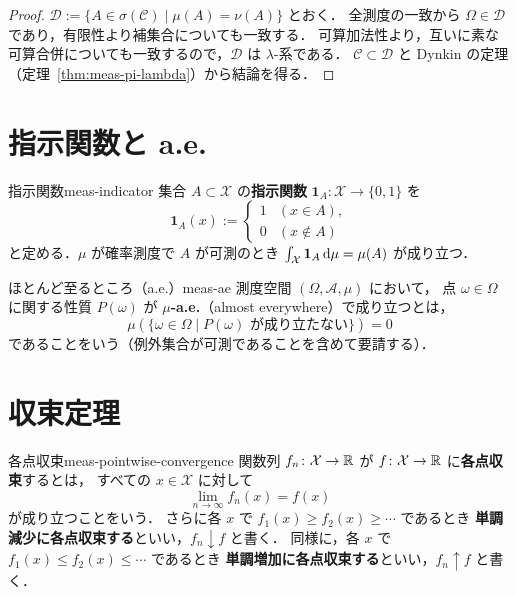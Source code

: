\begin{proof}
  $\mathcal{D}:=\{A\in\sigma(\mathcal{C})\mid\mu(A)=\nu(A)\}$ とおく．
  全測度の一致から $\Omega\in\mathcal{D}$ であり，有限性より補集合についても一致する．
  可算加法性より，互いに素な可算合併についても一致するので，$\mathcal{D}$ は $\lambda$-系である．
  $\mathcal{C}\subset\mathcal{D}$ と Dynkin の定理（定理~\ref{thm:meas-pi-lambda}）から結論を得る．
\end{proof}

\section{指示関数と a.e.}

\begin{definition}{指示関数}{meas-indicator}
  集合 $A\subset \mathcal{X}$ の\textbf{指示関数} $\mathbf{1}_A\colon \mathcal{X}\to\{0,1\}$ を
  \[
    \mathbf{1}_A(x):=
    \begin{cases}
      1 & (x\in A),\\
      0 & (x\notin A)
    \end{cases}
  \]
  と定める．$\mu$ が確率測度で $A$ が可測のとき
  $\int_{\mathcal{X}}\mathbf{1}_A\,\mathrm{d}\mu=\mu(A)$ が成り立つ．
\end{definition}

\begin{definition}{ほとんど至るところ（a.e.）}{meas-ae}
  測度空間 $(\Omega,\mathcal{A},\mu)$ において，
  点 $\omega\in\Omega$ に関する性質 $P(\omega)$ が
  $\mu$\textbf{-a.e.}（almost everywhere）で成り立つとは，
  \[
    \mu(\{\omega\in\Omega\mid P(\omega)\text{ が成り立たない}\})=0
  \]
  であることをいう（例外集合が可測であることを含めて要請する）．
\end{definition}

\section{収束定理}

\begin{definition}{各点収束}{meas-pointwise-convergence}
  関数列 $f_n\colon \mathcal{X}\to\mathbb{R}$ が $f\colon \mathcal{X}\to\mathbb{R}$ に\textbf{各点収束}するとは，
  すべての $x\in \mathcal{X}$ に対して
  \[
    \lim_{n\to\infty}f_n(x)=f(x)
  \]
  が成り立つことをいう．
  さらに各 $x$ で $f_1(x)\geq f_2(x)\geq\cdots$ であるとき
  \textbf{単調減少に各点収束する}といい，$f_n\downarrow f$ と書く．
  同様に，各 $x$ で $f_1(x)\leq f_2(x)\leq\cdots$ であるとき
  \textbf{単調増加に各点収束する}といい，$f_n\uparrow f$ と書く．
\end{definition}

